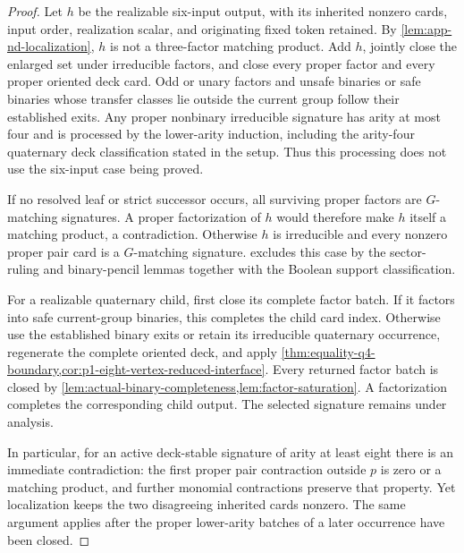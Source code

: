 \documentclass[11pt,letterpaper,onecolumn]{article}
\theoremstyle{plain}
\theoremstyle{definition}
\theoremstyle{remark}
\begin{document}
\begin{proof}
Let \(h\) be the realizable six-input output, with its inherited nonzero cards,
input order, realization scalar, and originating fixed token retained.
By \cref{lem:app-nd-localization}, \(h\) is not a three-factor matching
product.  Add \(h\), jointly close the enlarged set under irreducible factors, and close every proper
factor and every proper oriented deck card.  Odd or unary factors and
unsafe binaries or safe binaries whose transfer classes lie outside the current group follow their
established exits.  Any proper nonbinary irreducible signature has arity at most four and
is processed by the lower-arity induction, including the arity-four
quaternary deck classification stated in the setup.  Thus this processing does
not use the six-input case being proved.

If no resolved leaf or strict successor occurs, all surviving proper
factors are \(G\)-matching signatures.  A proper factorization of
\(h\) would therefore make \(h\) itself a matching product, a
contradiction.  Otherwise \(h\) is irreducible and every nonzero proper
pair card is a \(G\)-matching signature.   excludes this case by the sector-ruling and
binary-pencil lemmas together with the Boolean support classification.

For a realizable quaternary child, first close its complete factor batch.
If it factors into safe current-group binaries, this completes the child
card index.  Otherwise use the established binary exits or retain its irreducible
quaternary occurrence, regenerate the complete oriented deck, and apply
\cref{thm:equality-q4-boundary,cor:p1-eight-vertex-reduced-interface}.
Every returned factor batch is closed by
\cref{lem:actual-binary-completeness,lem:factor-saturation}.
A factorization completes the corresponding child output. The selected
signature remains under analysis.

In particular, for an active deck-stable signature of arity at least eight there
is an immediate contradiction: the first proper pair contraction outside
\(p\) is zero or a matching product, and further monomial contractions
preserve that property.  Yet localization keeps the two disagreeing
inherited cards nonzero.  The same argument applies after the proper
lower-arity batches of a later occurrence have been closed.
\end{proof}
\end{document}
